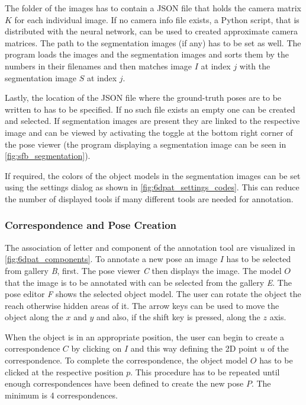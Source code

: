 The folder of the images has to contain a JSON file that holds the camera matrix $K$ for each individual image. If no camera info file exists, a Python script, that is distributed with the neural network, can be used to created approximate camera matrices. The path to the segmentation images (if any) has to be set as well. The program loads the images and the segmentation images and sorts them by the numbers in their filenames and then matches image $I$ at index $j$ with the segmentation image $S$ at index $j$. 

Lastly, the location of the JSON file where the ground-truth poses are to be written to has to be specified. If no such file exists an empty one can be created and selected. If segmentation images are present they are linked to the respective image and can be viewed by activating the toggle at the bottom right corner of the pose viewer (the program displaying a segmentation image can be seen in \fig \ref{fig:sfb_segmentation}). 

If required, the colors of the object models in the segmentation images can be set using the settings dialog as shown in \fig \ref{fig:6dpat_settings_codes}. This can reduce the number of displayed tools if many different tools are needed for annotation.

\subsubsection{Correspondence and Pose Creation} \label{subsection:correspondence_and_pose_creation}

The association of letter and component of the annotation tool are visualized in \fig \ref{fig:6dpat_components}. To annotate a new pose an image $I$ has to be selected from gallery \textit{B}, first. The pose viewer \textit{C} then displays the image. The model $O$ that the image is to be annotated with can be selected from the gallery \textit{E}. The pose editor \textit{F} shows the selected object model. The user can rotate the object the reach otherwise hidden areas of it. The arrow keys can be used to move the object along the $x$ and $y$ and also, if the shift key is pressed, along the $z$ axis. 

When the object is in an appropriate position, the user can begin to create a correspondence $C$ by clicking on $I$ and this way defining the 2D point $u$ of the correspondence. To complete the correspondence, the object model $O$ has to be clicked at the respective position $p$. This procedure has to be repeated until enough correspondences have been defined to create the new pose $P$. The minimum is 4 correspondences. 

